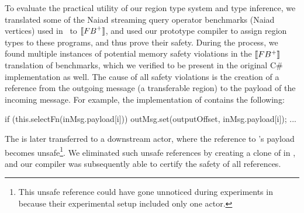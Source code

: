 To evaluate the practical utility of our region type system and type
inference, we 
translated some of the Naiad streaming query operator benchmarks
(Naiad vertices) used in~\cite{Broom:HotOS} to $\llbracket {\sc FB}^+ \rrbracket$, and
used our prototype compiler to assign region types to these programs,
and thus prove their safety. During the process, we found multiple
instances of potential memory safety violations in the $\llbracket FB^+ \rrbracket$
translation of benchmarks, which we verified to be present in the
original C\# implementation as well. The cause of all safety
violations is the creation of a reference from the outgoing message (a
transferable region) to the payload of the incoming message. For
example, the implementation of  contains the
following:
\begin{codejava}
  if (this.selectFn(inMsg.payload[i])) {
    outMsg.set(outputOffset, inMsg.payload[i]);
    ...
  } 
\end{codejava}
The  is later transferred to a downstream actor, where the
reference to 's payload becomes unsafe\footnote{This unsafe
reference could have gone unnoticed during experiments
in~\cite{Broom:HotOS} because their experimental setup included only
one actor.}. We eliminated such unsafe references by creating a clone
of  in , and our compiler was
subsequently able to certify the safety of all references.


